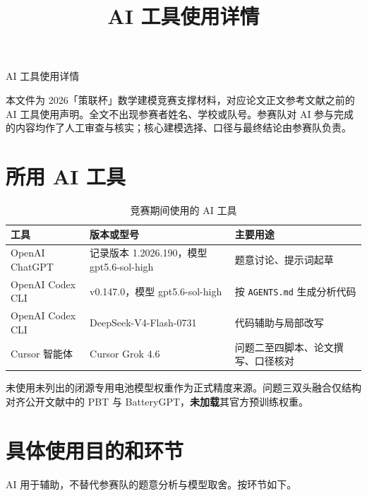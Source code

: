 \documentclass[a4paper,12pt,UTF8,zihao=-4]{ctexart}
\title{AI 工具使用详情}
\author{}
\date{}
\begin{document}
\begin{center}
{\heiti{} AI 工具使用详情}
\end{center}

\vspace{0.6em}
\noindent
本文件为 2026「策联杯」数学建模竞赛支撑材料，对应论文正文参考文献之前的 AI 工具使用声明。全文不出现参赛者姓名、学校或队号。参赛队对 AI 参与完成的内容均作了人工审查与核实；核心建模选择、口径与最终结论由参赛队负责。

\section{所用 AI 工具}

\begin{table}[htbp]
\centering
\small
\caption{竞赛期间使用的 AI 工具}
\begin{tabular}{p{}p{}p{}}
\toprule
工具 & 版本或型号 & 主要用途 \\
\midrule
OpenAI ChatGPT & 记录版本 1.2026.190，模型 gpt5.6-sol-high & 题意讨论、提示词起草 \\
OpenAI Codex CLI & v0.147.0，模型 gpt5.6-sol-high & 按 \texttt{AGENTS.md} 生成分析代码 \\
OpenAI Codex CLI & DeepSeek-V4-Flash-0731 & 代码辅助与局部改写 \\
Cursor 智能体 & Cursor Grok 4.6 & 问题二至四脚本、论文撰写、口径核对 \\
\bottomrule
\end{tabular}
\end{table}

未使用未列出的闭源专用电池模型权重作为正式精度来源。问题三双头融合仅结构对齐公开文献中的 PBT 与 BatteryGPT，\textbf{未加载}其官方预训练权重。

\section{具体使用目的和环节}

AI 用于辅助，不替代参赛队的题意分析与模型取舍。按环节如下。
\end{document}
